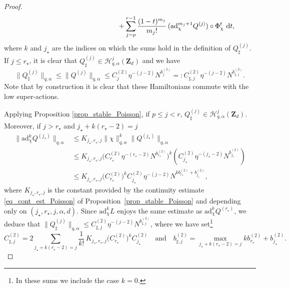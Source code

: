 \begin{proof}
\begin{align*}
&\hspace*{5cm}+ \sum_{j=p}^{r-1} \frac{(1-t)^{m_j}}{m_j !}\, (\mathrm{ad}_{\chi}^{m_j+1} Q^{(j)}) \circ \Phi_\chi^t \ \mathrm{d}t,
\end{align*}
where $k$ and $j_\star$ are the indices on which the sums hold in the definition of $Q^{(j)}_\sharp$.\\
If $j\leq r_\star$, it is clear that $Q^{(j)}_\sharp \in \mathscr{H}_{q,\alpha}^{j}(\mathbf{Z}_d)$ and we have\vspace*{-3pt}
\[
\| Q^{(j)}_\sharp \|_{q,\alpha} \leq \| Q^{(j)} \|_{q,\alpha} \leq C_{j}^{(2)} \eta^{-(j-2)} N^{b_j^{(2)}} =: C_{\sharp,j}^{(2)} \eta^{-(j-2)} N^{b_{\sharp,j}^{(2)}}.
\]
Note that by construction it is clear that these Hamiltonians commute with the low super-actions.

Applying Proposition \ref{prop_stable_Poisson}, if $p\leq j< r$, $Q^{(j)}_\sharp \in \mathscr{H}_{q,\alpha}^{j}(\mathbf{Z}_d)$. Moreover, if $j>r_\star$ and $j_\star+k(r_\star - 2)= j$
\begin{equation*}
\begin{split}
\! \! \! \! \! \! \| \mathrm{ad}_{\chi}^k Q^{(j_\star)} \|_{q,\alpha} & \leq K_{j_\star,r_\star,j} \| \chi \|_{q,\alpha}^k \| Q^{(j_\star)} \|_{q,\alpha} \\
&\leq K_{j_\star,r_\star,j} \big(C_{r_\star}^{(2)} \eta^{-(r_\star-2)} N^{b_{r_\star}^{(2)}} \big)^k (C_{j_\star}^{(2)} \eta^{-(j_\star-2)} N^{b_{j_\star}^{(2)}}) \\
&\leq K_{j_\star,r_\star,j} \big(C_{r_\star}^{(2)} \big)^k C_{j_\star}^{(2)} \eta^{-(j-2)} N^{kb_{r_\star}^{(2)} + b_{j_\star}^{(2)} },
\end{split}
\end{equation*}
where $K_{j_\star,r_\star,j}$ is the constant provided by the continuity estimate \eqref{eq_cont_est_Poisson} of Proposition~\ref{prop_stable_Poisson} and depending only on $(j_\star,r_\star,j,\alpha,d)$. Since $\mathrm{ad}_{\chi}^k L$ enjoys the same estimate as $\mathrm{ad}_{\chi}^k Q^{(r_\star)}$, we deduce that $\| Q^{(j)}_\sharp \|_{q,\alpha} \leq C_{\sharp,j}^{(2)} \eta^{-(j-2)} N^{b_{\sharp,j}^{(2)}}$, where we have set\footnote{In these sums we include the case $k=0$.}
\[
C_{\sharp,j}^{(2)} = 2 \! \! \! \sum_{ j_\star+k(r_\star - 2)= j} \frac1{k !}\, K_{j_\star,r_\star,j} \big(C_{r_\star}^{(2)} \big)^k C_{j_\star}^{(2)} \quad \text{and} \quad b_{\sharp,j}^{(2)} = \max_{j_\star+k(r_\star - 2)= j} kb_{r_\star}^{(2)} + b_{j_\star}^{(2)}.
\]


\end{proof}

